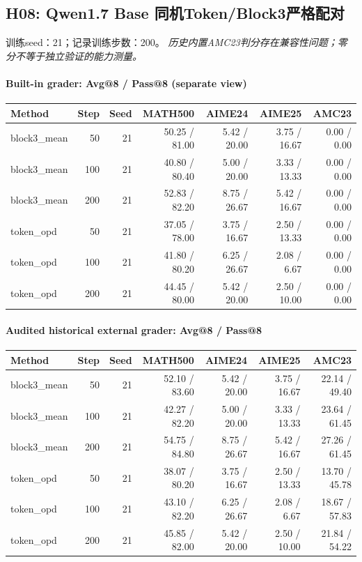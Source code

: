 \subsection{H08: Qwen1.7 Base 同机Token/Block3严格配对}
\label{history:qwen17_ml2}
训练seed：21；记录训练步数：200。
\emph{历史内置AMC23判分存在兼容性问题；零分不等于独立验证的能力测量。}
\paragraph{Built-in grader: Avg@8 / Pass@8 (separate view)}
{\footnotesize\setlength{\tabcolsep}{3.5pt}
\begin{longtable}{@{}p{1.4in}rrrrrr@{}}
\toprule
Method & Step & Seed & MATH500 & AIME24 & AIME25 & AMC23 \\
\midrule\endhead
block3\_\allowbreak{}mean & 50 & 21 & 50.25 / 81.00 & 5.42 / 20.00 & 3.75 / 16.67 & 0.00 / 0.00 \\
block3\_\allowbreak{}mean & 100 & 21 & 40.80 / 80.40 & 5.00 / 20.00 & 3.33 / 13.33 & 0.00 / 0.00 \\
block3\_\allowbreak{}mean & 200 & 21 & 52.83 / 82.20 & 8.75 / 26.67 & 5.42 / 16.67 & 0.00 / 0.00 \\
token\_\allowbreak{}opd & 50 & 21 & 37.05 / 78.00 & 3.75 / 16.67 & 2.50 / 13.33 & 0.00 / 0.00 \\
token\_\allowbreak{}opd & 100 & 21 & 41.80 / 80.20 & 6.25 / 26.67 & 2.08 / 6.67 & 0.00 / 0.00 \\
token\_\allowbreak{}opd & 200 & 21 & 44.45 / 80.00 & 5.42 / 20.00 & 2.50 / 10.00 & 0.00 / 0.00 \\
\bottomrule\end{longtable}
}
\paragraph{Audited historical external grader: Avg@8 / Pass@8}
{\footnotesize\setlength{\tabcolsep}{3.5pt}
\begin{longtable}{@{}p{1.4in}rrrrrr@{}}
\toprule
Method & Step & Seed & MATH500 & AIME24 & AIME25 & AMC23 \\
\midrule\endhead
block3\_\allowbreak{}mean & 50 & 21 & 52.10 / 83.60 & 5.42 / 20.00 & 3.75 / 16.67 & 22.14 / 49.40 \\
block3\_\allowbreak{}mean & 100 & 21 & 42.27 / 82.20 & 5.00 / 20.00 & 3.33 / 13.33 & 23.64 / 61.45 \\
block3\_\allowbreak{}mean & 200 & 21 & 54.75 / 84.80 & 8.75 / 26.67 & 5.42 / 16.67 & 27.26 / 61.45 \\
token\_\allowbreak{}opd & 50 & 21 & 38.07 / 80.20 & 3.75 / 16.67 & 2.50 / 13.33 & 13.70 / 45.78 \\
token\_\allowbreak{}opd & 100 & 21 & 43.10 / 82.20 & 6.25 / 26.67 & 2.08 / 6.67 & 18.67 / 57.83 \\
token\_\allowbreak{}opd & 200 & 21 & 45.85 / 82.00 & 5.42 / 20.00 & 2.50 / 10.00 & 21.84 / 54.22 \\
\bottomrule\end{longtable}
}
